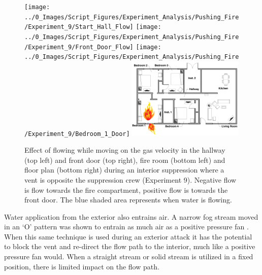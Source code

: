 \documentclass[12pt,oneside]{book}
\begin{document}
\begin{figure}[H]
\centering
\texttt{[image: ../0\_Images/Script\_Figures/Experiment\_Analysis/Pushing\_Fire/Experiment\_9/Start\_Hall\_Flow]}
\texttt{[image: ../0\_Images/Script\_Figures/Experiment\_Analysis/Pushing\_Fire/Experiment\_9/Front\_Door\_Flow]}
\texttt{[image: ../0\_Images/Script\_Figures/Experiment\_Analysis/Pushing\_Fire/Experiment\_9/Bedroom\_1\_Door]}
\includegraphics[width=0.495\textwidth]{../0_Images/Tactical_Considerations/Flow_Path_Effect/Single_Vent_Clean}
\caption[Hallway and Front Door Flow - Flow \& Move Interior Attack]{Effect of flowing while moving on the gas velocity in the hallway (top left) and front door (top right), fire room (bottom left) and floor plan (bottom right) during an interior suppression where a vent is opposite the suppression crew (Experiment 9). Negative flow is flow towards the fire compartment, positive flow is towards the front door. The blue shaded area represents when water is flowing.}
\label{fig:flow_path_effect_TC_vent_oppsite}
\end{figure}

Water application from the exterior also entrains air. A narrow fog stream moved in an `O' pattern was shown to entrain as much air as a positive pressure fan \cite{Weinchenk_airentrainment}. When this same technique is used during an exterior attack it has the potential to block the vent and re-direct the flow path to the interior, much like a positive pressure fan would. When a straight stream or solid stream is utilized in a fixed position, there is limited impact on the flow path. 
\end{document}
